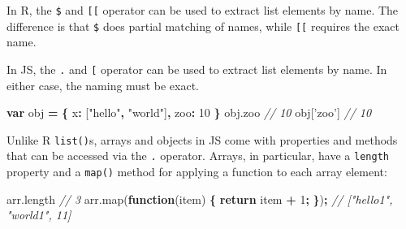 \documentclass[
  12pt,
]{krantz}
\newenvironment{Shaded}{\begin{snugshade}}{\end{snugshade}}
\newcommand{\AttributeTok}[1]{\textcolor[rgb]{0.77,0.63,0.00}{#1}}
\newcommand{\CommentTok}[1]{\textcolor[rgb]{0.56,0.35,0.01}{\textit{#1}}}
\newcommand{\ControlFlowTok}[1]{\textcolor[rgb]{0.13,0.29,0.53}{\textbf{#1}}}
\newcommand{\DataTypeTok}[1]{\textcolor[rgb]{0.13,0.29,0.53}{#1}}
\newcommand{\DecValTok}[1]{\textcolor[rgb]{0.00,0.00,0.81}{#1}}
\newcommand{\KeywordTok}[1]{\textcolor[rgb]{0.13,0.29,0.53}{\textbf{#1}}}
\newcommand{\NormalTok}[1]{#1}
\newcommand{\OperatorTok}[1]{\textcolor[rgb]{0.81,0.36,0.00}{\textbf{#1}}}
\newcommand{\StringTok}[1]{\textcolor[rgb]{0.31,0.60,0.02}{#1}}
\newcommand{\VariableTok}[1]{\textcolor[rgb]{0.00,0.00,0.00}{#1}}
\begin{document}
In R, the \texttt{\$} and \texttt{{[}{[}} operator can be used to extract list elements by name. The difference is that \texttt{\$} does partial matching of names, while \texttt{{[}{[}} requires the exact name.

\begin{Shaded}
\end{Shaded}

In JS, the \texttt{.} and \texttt{{[}} operator can be used to extract list elements by name. In either case, the naming must be exact.

\begin{Shaded}
\begin{Highlighting}[]
\KeywordTok{var}\NormalTok{ obj }\OperatorTok{=} \OperatorTok{\{}
  \DataTypeTok{x}\OperatorTok{:}\NormalTok{ [}\StringTok{"hello"}\OperatorTok{,} \StringTok{"world"}\NormalTok{]}\OperatorTok{,}
  \DataTypeTok{zoo}\OperatorTok{:} \DecValTok{10}
\OperatorTok{\}}
\VariableTok{obj}\NormalTok{.}\AttributeTok{zoo}
\CommentTok{// 10}
\NormalTok{obj[}\StringTok{'zoo'}\NormalTok{]}
\CommentTok{// 10}
\end{Highlighting}
\end{Shaded}

Unlike R \texttt{list()}s, arrays and objects in JS come with properties and methods that can be accessed via the \texttt{.} operator. Arrays, in particular, have a \texttt{length} property and a \texttt{map()} method for applying a function to each array element:

\begin{Shaded}
\begin{Highlighting}[]
\VariableTok{arr}\NormalTok{.}\AttributeTok{length}
\CommentTok{// 3}
\VariableTok{arr}\NormalTok{.}\AttributeTok{map}\NormalTok{(}\KeywordTok{function}\NormalTok{(item) }\OperatorTok{\{} \ControlFlowTok{return}\NormalTok{ item }\OperatorTok{+} \DecValTok{1}\OperatorTok{;} \OperatorTok{\}}\NormalTok{)}\OperatorTok{;}
\CommentTok{// ["hello1", "world1", 11]}
\end{Highlighting}
\end{Shaded}
\end{document}
